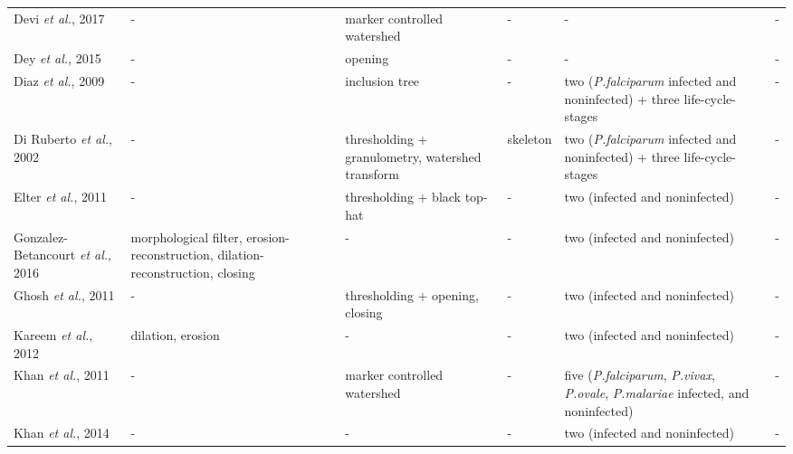 \begin{longtable}{C{2.1cm} C{2.1cm} C{2.3cm} C{1.5cm} C{2.7cm} C{2.2cm} }
    Devi \emph{et al.}, 2017 &
		- &
		marker controlled watershed &	
		- &
		- &
		-
		\vspace{0.6cm}
        \\       
        
        Dey \emph{et al.}, 2015 &
		- &
		opening &	
		- &
		- &
		-
		\vspace{0.6cm}
        \\        
       
    Diaz \emph{et al.}, 2009 &
		- &
		inclusion tree &	
		- &
		two (\emph{P.falciparum} infected and noninfected) + three life-cycle-stages &
		-
\vspace{0.6cm}
		\\   
         
    Di Ruberto \emph{et al.}, 2002 &
		- &
		thresholding + granulometry, watershed  transform &	
		skeleton &
		two (\emph{P.falciparum} infected and noninfected) + three life-cycle-stages &
		-
\vspace{0.6cm}
		\\

    Elter \emph{et al.}, 2011 &
		- &
		thresholding + black top-hat &	
		- &
		two (infected and noninfected) &
		-
		\vspace{0.6cm} \\

    Gonzalez-Betancourt \emph{et al.}, 2016  &
    	morphological filter, erosion-reconstruction, dilation-reconstruction, closing &
    	-  &
    	- &
    	two (infected and noninfected) &
    	- \vspace{0.6cm} \\	

    Ghosh \emph{et al.}, 2011  &
    	- &
    	thresholding + opening, closing  &
    	- &
    	two (infected and noninfected) &
    	- \vspace{0.6cm} \\

    Kareem \emph{et al.}, 2012  &
    	dilation, erosion &
    	-  &
    	- &
    	two (infected and noninfected) &
    	- \vspace{0.6cm} \\	

    Khan \emph{et al.}, 2011  &
    	- &
    	marker controlled watershed  &
    	- &
    	five (\emph{P.falciparum}, \emph{P.vivax}, \emph{P.ovale}, \emph{P.malariae} infected, and noninfected) &
    	- \vspace{0.6cm} \\	

    Khan \emph{et al.}, 2014  &
    	- &
    	- &
    	- &
    	two (infected and noninfected) &
    	- \vspace{0.6cm} \\	


\end{longtable}
